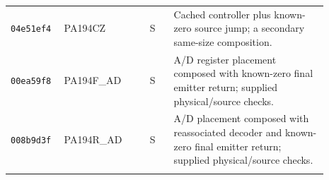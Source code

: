 \begin{longtable}{p{0.12\linewidth}p{0.25\linewidth}p{0.07\linewidth}p{0.45\linewidth}}
\texttt{04e51ef4} & PA194CZ & S & Cached controller plus known-zero source jump; a secondary same-size composition. \\ \addlinespace[2pt]
\texttt{00ea59f8} & PA194F\_\allowbreak AD & S & A/D register placement composed with known-zero final emitter return; supplied physical/source checks. \\ \addlinespace[2pt]
\texttt{008b9d3f} & PA194R\_\allowbreak AD & S & A/D placement composed with reassociated decoder and known-zero final emitter return; supplied physical/source checks. \\ \addlinespace[2pt]
\end{longtable}
\endgroup
